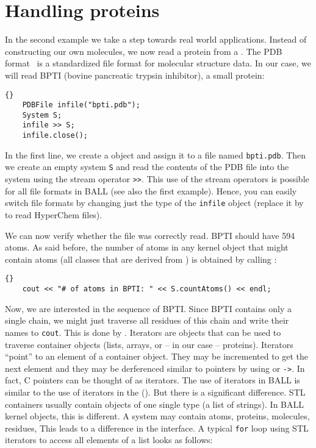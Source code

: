 \section{Handling proteins}

In the second example we take a step towards real world applications. Instead
of constructing our own molecules, we now read a protein from a . The PDB format~\cite{PDB} is a standardized file format for molecular structure
data. In our case, we will read BPTI (bovine pancreatic trypsin inhibitor), a
small protein:

\begin{lstlisting}{}
	PDBFile infile("bpti.pdb");
	System S;
	infile >> S;
	infile.close();
\end{lstlisting}

\noindent
In the first line, we create a  object and assign it to a file
named {\tt bpti.pdb}. Then we create an empty system {\tt S} and read the
contents of the PDB file into the system using the stream operator {\tt >>}.
This use of the stream operators is possible for all file formats in BALL (see
also the first example). Hence, you can easily switch file formats
by changing just the type of the {\tt infile} object (\eg replace it by
 to read HyperChem files).

We can now verify whether the file was correctly read. BPTI should have 594
atoms. As said before, the number of atoms in any kernel object that might
contain atoms (\ie all classes that are derived from ) is
obtained by calling :

\begin{lstlisting}{}
	cout << "# of atoms in BPTI: " << S.countAtoms() << endl;
\end{lstlisting}

Now, we are interested in the sequence of BPTI. Since BPTI contains only a
single chain, we might just traverse all residues of this chain and write
their names to {\tt cout}. This is done by . Iterators are
objects that can be used to traverse container objects (\eg lists, arrays, or
-- in our case -- proteins). Iterators ``point'' to an element of a container
object. They may be incremented to get the next element and they may be
derferenced similar to pointers by using {\tt *} or {\tt ->}. In fact,
C pointers can be thought of as iterators.
The use of iterators in BALL is similar to the
use of iterators in the  ().
But there is a significant difference. STL containers usually contain objects of
one single type (\eg a list of strings). In BALL kernel objects, this is
different. A system may contain atoms, proteins, molecules, residues, \etc
This leads to a difference in the interface. A typical {\tt for} loop using STL
iterators to access all elements of a list looks as follows:

